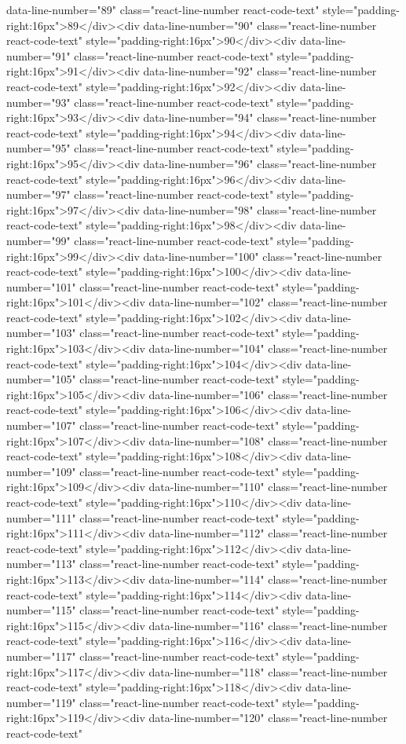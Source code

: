data-line-number="89" class="react-line-number react-code-text" style="padding-right:16px">89</div><div data-line-number="90" class="react-line-number react-code-text" style="padding-right:16px">90</div><div data-line-number="91" class="react-line-number react-code-text" style="padding-right:16px">91</div><div data-line-number="92" class="react-line-number react-code-text" style="padding-right:16px">92</div><div data-line-number="93" class="react-line-number react-code-text" style="padding-right:16px">93</div><div data-line-number="94" class="react-line-number react-code-text" style="padding-right:16px">94</div><div data-line-number="95" class="react-line-number react-code-text" style="padding-right:16px">95</div><div data-line-number="96" class="react-line-number react-code-text" style="padding-right:16px">96</div><div data-line-number="97" class="react-line-number react-code-text" style="padding-right:16px">97</div><div data-line-number="98" class="react-line-number react-code-text" style="padding-right:16px">98</div><div data-line-number="99" class="react-line-number react-code-text" style="padding-right:16px">99</div><div data-line-number="100" class="react-line-number react-code-text" style="padding-right:16px">100</div><div data-line-number="101" class="react-line-number react-code-text" style="padding-right:16px">101</div><div data-line-number="102" class="react-line-number react-code-text" style="padding-right:16px">102</div><div data-line-number="103" class="react-line-number react-code-text" style="padding-right:16px">103</div><div data-line-number="104" class="react-line-number react-code-text" style="padding-right:16px">104</div><div data-line-number="105" class="react-line-number react-code-text" style="padding-right:16px">105</div><div data-line-number="106" class="react-line-number react-code-text" style="padding-right:16px">106</div><div data-line-number="107" class="react-line-number react-code-text" style="padding-right:16px">107</div><div data-line-number="108" class="react-line-number react-code-text" style="padding-right:16px">108</div><div data-line-number="109" class="react-line-number react-code-text" style="padding-right:16px">109</div><div data-line-number="110" class="react-line-number react-code-text" style="padding-right:16px">110</div><div data-line-number="111" class="react-line-number react-code-text" style="padding-right:16px">111</div><div data-line-number="112" class="react-line-number react-code-text" style="padding-right:16px">112</div><div data-line-number="113" class="react-line-number react-code-text" style="padding-right:16px">113</div><div data-line-number="114" class="react-line-number react-code-text" style="padding-right:16px">114</div><div data-line-number="115" class="react-line-number react-code-text" style="padding-right:16px">115</div><div data-line-number="116" class="react-line-number react-code-text" style="padding-right:16px">116</div><div data-line-number="117" class="react-line-number react-code-text" style="padding-right:16px">117</div><div data-line-number="118" class="react-line-number react-code-text" style="padding-right:16px">118</div><div data-line-number="119" class="react-line-number react-code-text" style="padding-right:16px">119</div><div data-line-number="120" class="react-line-number react-code-text" 
